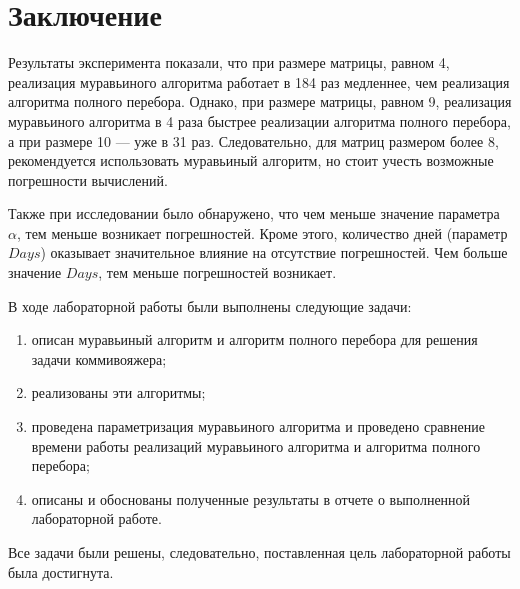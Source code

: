 \chapter*{Заключение}

Результаты эксперимента показали, что при размере матрицы, равном 4, реализация муравьиного алгоритма работает в 184 раз медленнее, чем реализация алгоритма полного перебора. Однако, при размере матрицы, равном 9, реализация муравьиного алгоритма в 4 раза быстрее реализации алгоритма полного перебора, а при размере 10 --- уже в 31 раз. Следовательно, для матриц размером более 8, рекомендуется использовать муравьиный алгоритм, но стоит учесть возможные погрешности вычислений.

Также при исследовании было обнаружено, что чем меньше значение параметра $\alpha$, тем меньше возникает погрешностей. Кроме этого, количество дней (параметр $Days$) оказывает значительное влияние на отсутствие погрешностей. Чем больше значение $Days$, тем меньше погрешностей возникает.

В ходе лабораторной работы были выполнены следующие задачи: 
\begin{enumerate}[label=\arabic*)]
	\item описан муравьиный алгоритм и алгоритм полного перебора для решения задачи коммивояжера;
	\item реализованы эти алгоритмы;
	\item проведена параметризация муравьиного алгоритма и проведено сравнение времени работы реализаций муравьиного алгоритма и алгоритма полного перебора;
	\item описаны и обоснованы полученные результаты в отчете о выполненной лабораторной работе.
\end{enumerate}

Все задачи были решены, следовательно, поставленная цель лабораторной работы была достигнута.